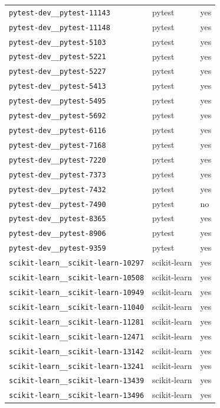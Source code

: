 \begin{longtable}{@{}p{}lp{}@{}}
\texttt{pytest-dev\_\_pytest-11143} & pytest & yes \\
\texttt{pytest-dev\_\_pytest-11148} & pytest & yes \\
\texttt{pytest-dev\_\_pytest-5103} & pytest & yes \\
\texttt{pytest-dev\_\_pytest-5221} & pytest & yes \\
\texttt{pytest-dev\_\_pytest-5227} & pytest & yes \\
\texttt{pytest-dev\_\_pytest-5413} & pytest & yes \\
\texttt{pytest-dev\_\_pytest-5495} & pytest & yes \\
\texttt{pytest-dev\_\_pytest-5692} & pytest & yes \\
\texttt{pytest-dev\_\_pytest-6116} & pytest & yes \\
\texttt{pytest-dev\_\_pytest-7168} & pytest & yes \\
\texttt{pytest-dev\_\_pytest-7220} & pytest & yes \\
\texttt{pytest-dev\_\_pytest-7373} & pytest & yes \\
\texttt{pytest-dev\_\_pytest-7432} & pytest & yes \\
\texttt{pytest-dev\_\_pytest-7490} & pytest & no \\
\texttt{pytest-dev\_\_pytest-8365} & pytest & yes \\
\texttt{pytest-dev\_\_pytest-8906} & pytest & yes \\
\texttt{pytest-dev\_\_pytest-9359} & pytest & yes \\
\texttt{scikit-learn\_\_scikit-learn-10297} & scikit-learn & yes \\
\texttt{scikit-learn\_\_scikit-learn-10508} & scikit-learn & yes \\
\texttt{scikit-learn\_\_scikit-learn-10949} & scikit-learn & yes \\
\texttt{scikit-learn\_\_scikit-learn-11040} & scikit-learn & yes \\
\texttt{scikit-learn\_\_scikit-learn-11281} & scikit-learn & yes \\
\texttt{scikit-learn\_\_scikit-learn-12471} & scikit-learn & yes \\
\texttt{scikit-learn\_\_scikit-learn-13142} & scikit-learn & yes \\
\texttt{scikit-learn\_\_scikit-learn-13241} & scikit-learn & yes \\
\texttt{scikit-learn\_\_scikit-learn-13439} & scikit-learn & yes \\
\texttt{scikit-learn\_\_scikit-learn-13496} & scikit-learn & yes \\

\end{longtable}
